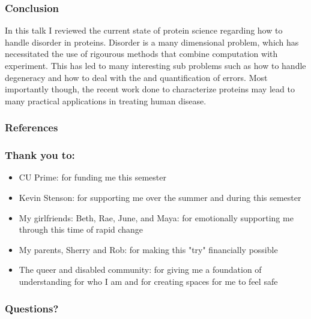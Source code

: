 \documentclass{beamer}
\begin{document}
\begin{frame}
    \frametitle{Conclusion}
    In this talk I reviewed the current state of protein science regarding how to handle disorder in proteins.
    Disorder is a many dimensional problem, which has necessitated the use of rigourous methods that combine computation with experiment.
    This has led to many interesting sub problems such as how to handle degeneracy and how to deal with the and quantification of errors.
    Most importantly though, the recent work done to characterize proteins may lead to many practical applications in treating human disease.

\end{frame}

\begin{frame}[allowframebreaks]
\frametitle{References}
\printbibliography
\end{frame}

\begin{frame}
    \frametitle{Thank you to:} 
    \begin{itemize}
        \item CU Prime: for funding me this semester
        \item Kevin Stenson: for supporting me over the summer and during this semester
        \item My girlfriends: Beth, Rae, June, and Maya: for emotionally supporting me through this time of rapid change
        \item My parents, Sherry and Rob: for making this "try" financially possible
        \item The queer and disabled community: for giving me a foundation of understanding for who I am and for creating spaces for me to feel safe
    \end{itemize}
\end{frame}

\begin{frame}
\frametitle{Questions?}
\end{frame}
\end{document}
